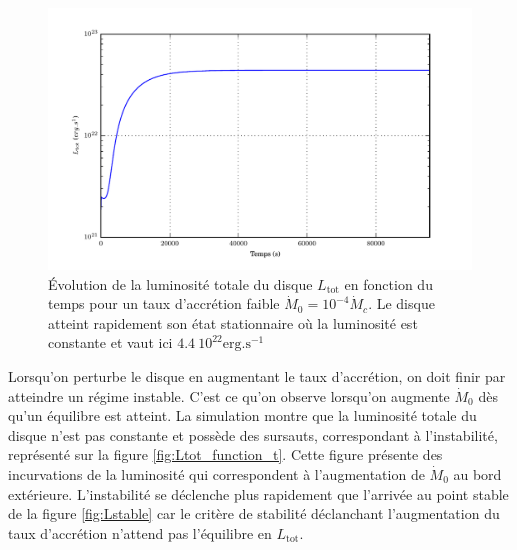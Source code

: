 \begin{figure}
  \includegraphics{figures/Ltot_fonction_t_stable.pdf}
  \caption{Évolution de la luminosité totale du disque $L_\mathrm{tot}$ en fonction du temps pour un taux d'accrétion faible $\dot{M}_0 = 10^{-4}\dot{M}_c$. Le disque atteint rapidement son état stationnaire où la luminosité est constante et vaut ici $4.4\ 10^{22}\mathrm{erg.s^{-1}}$}
  \label{eq:Lstable}
\end{figure}

Lorsqu'on perturbe le disque en augmentant le taux d'accrétion, on doit finir par atteindre un régime instable. C'est ce qu'on observe lorsqu'on augmente $\dot{M}_0$ dès qu'un équilibre est atteint. La simulation montre que la luminosité totale du disque n'est pas constante et possède des sursauts, correspondant à l'instabilité, représenté sur la figure \ref{fig:Ltot_function_t}. Cette figure présente des incurvations de la luminosité qui correspondent à l'augmentation de $\dot{M}_0$ au bord extérieure. L'instabilité se déclenche plus rapidement que l'arrivée au point stable de la figure \ref{fig:Lstable} car le critère de stabilité déclanchant l'augmentation du taux d'accrétion n'attend pas l'équilibre en $L_\mathrm{tot}$.

